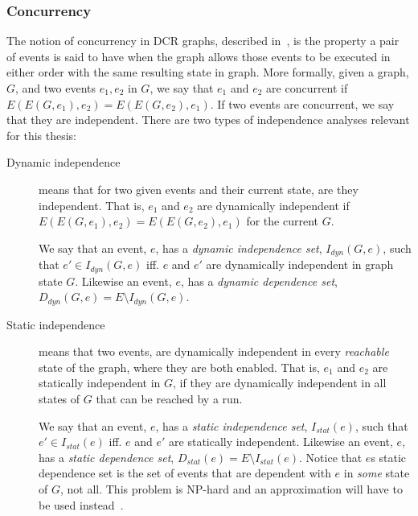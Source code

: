 \documentclass{article}
\begin{document}
			\subsubsection{Concurrency}
			\label{subsubsec:concurrency}

			The notion of concurrency in DCR graphs, described in~\cite{debois_concurrency_2015}, is the property a pair of events is said to have when the graph allows those events to be executed in either order with the same resulting state in graph.
			More formally, given a graph, $G$, and two events $e_1, e_2$ in $G$, we say that $e_1$ and $e_2$ are concurrent if $E(E(G, e_1),e_2)=E(E(G, e_2),e_1)$.
			If two events are concurrent, we say that they are independent.
			There are two types of independence analyses relevant for this thesis:
			\begin{description}
				\item[Dynamic independence] means that for two given events and their current state, are they independent.
				That is, $e_1$ and $e_2$ are dynamically independent if $E(E(G, e_1),e_2)=E(E(G, e_2),e_1)$ for the current $G$.

				We say that an event, $e$, has a \textit{dynamic independence set}, $I_{dyn}(G,e)$, such that $e' \in I_{dyn}(G,e)$ iff. $e$ and $e'$ are dynamically independent in graph state $G$.
				Likewise an event, $e$, has a \textit{dynamic dependence set}, $D_{dyn}(G,e) = E \setminus I_{dyn}(G,e)$.

				\item[Static independence] means that two events, are dynamically independent in every \textit{reachable} state of the graph, where they are both enabled.
				That is, $e_1$ and $e_2$ are statically independent in $G$, if they are dynamically independent in all states of $G$ that can be reached by a run.

				We say that an event, $e$, has a \textit{static independence set}, $I_{stat}(e)$, such that $e' \in I_{stat}(e)$ iff. $e$ and $e'$ are statically independent.
				Likewise an event, $e$, has a \textit{static dependence set}, $D_{stat}(e) = E \setminus I_{stat}(e)$.
				Notice that $e$s static dependence set is the set of events that are dependent with $e$ in \textit{some} state of $G$, not all.
				This problem is NP-hard and an approximation will have to be used instead~\cite{debois_concurrency_2015}.
			\end{description}
\end{document}
